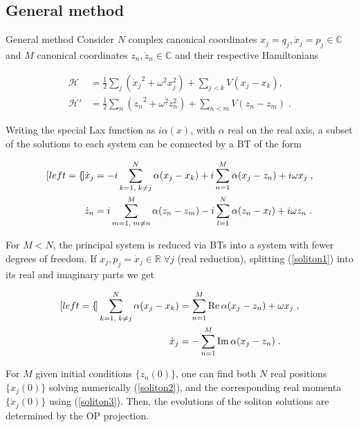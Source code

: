\documentclass[aspectratio=169, 9pt]{beamer}
\begin{document}
\subsection{General method}
\begin{frame}[allowframebreaks]{General method}
Consider $N$ complex canonical coordinates $x_j = q_j, \dot x_j = p_j \in \mathbb{C}$ and $M$ canonical coordinates $z_n, \dot z_n \in \mathbb{C}$ and their respective Hamiltonians

\begin{subequations}
\begin{align}
    \mathcal{H} &= \frac{1}{2}\sum_j ({\dot x_j}^2 + \omega^2 x_j^2) + \sum_{j < k} V(x_j - x_k), \\
    \mathcal{H'} &= \frac{1}{2}\sum_n ({\dot z_n}^2 + \omega^2 z_n^2) + \sum_{n < m} V(z_n - z_m)\;.
\end{align}
\end{subequations}

Writing the special Lax function as $i\alpha(x)$, with $\alpha$ real on the real axis, a subset of the solutions to each system can be connected by a BT of the form

\begin{subequations}
\begin{align}[left=\empheqlbrace]
\dot x_j &= - i\sum_{k=1,\;k \neq j}^N \alpha(x_j - x_k) + i\sum_{n = 1}^M \alpha(x_j - z_n) + i\omega x_j \label{soliton1}\;,\\
\dot z_n &= i\sum_{m=1,\;m \neq n}^M \alpha(z_n - z_m) - i\sum_{l = 1}^N \alpha(z_n - x_l) + i\omega z_n\label{soliton1b}\;.
\end{align}
\end{subequations}

For $M < N$, the principal system is reduced via BTs into a system with fewer degrees of freedom. If $x_j, p_j = \dot x_j \in \mathbb{R} \;\forall j$ (real reduction), splitting (\ref{soliton1}) into its real and imaginary parts we get

\begin{subequations}
\begin{align}[left=\empheqlbrace]
    \sum_{k=1,\;k \neq j}^N \alpha (x_j - x_k) &= \sum_{n=1}^M \operatorname{Re}{\alpha(x_j - z_n)} + \omega x_j \label{soliton2}\;, \\
    \dot x_j &= - \sum_{n = 1}^M \operatorname{Im}{\alpha(x_j - z_n)} \label{soliton3}\;.
\end{align}
\end{subequations}

For $M$ given initial conditions $\{z_n(0)\}$, one can find both $N$ real positions $\{x_j(0)\}$ solving numerically (\ref{soliton2}), and the corresponding real momenta $\{\dot x_j(0)\}$ using (\ref{soliton3}). Then, the evolutions of the soliton solutions are determined by the OP projection.
\end{frame}
\end{document}
